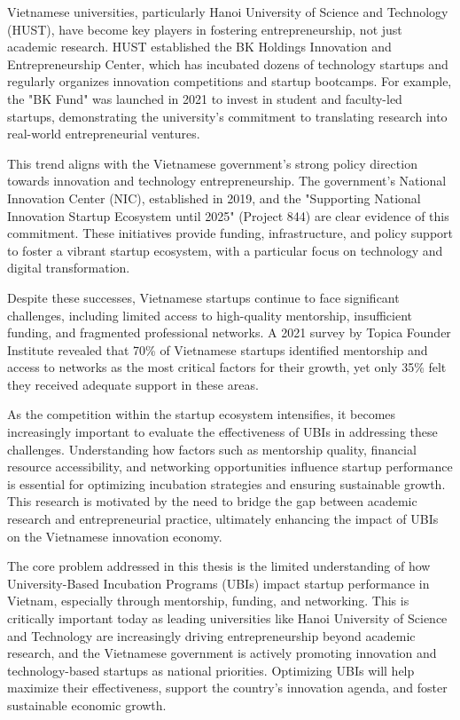 \documentclass[../Main.tex]{subfiles}
\begin{document}
	Vietnamese universities, particularly Hanoi University of Science and Technology (HUST), have become key players in fostering entrepreneurship, not just academic research. HUST established the BK Holdings Innovation and Entrepreneurship Center, which has incubated dozens of technology startups and regularly organizes innovation competitions and startup bootcamps. For example, the "BK Fund" was launched in 2021 to invest in student and faculty-led startups, demonstrating the university's commitment to translating research into real-world entrepreneurial ventures.

	This trend aligns with the Vietnamese government's strong policy direction towards innovation and technology entrepreneurship. The government's National Innovation Center (NIC), established in 2019, and the "Supporting National Innovation Startup Ecosystem until 2025" (Project 844) are clear evidence of this commitment. These initiatives provide funding, infrastructure, and policy support to foster a vibrant startup ecosystem, with a particular focus on technology and digital transformation.

	Despite these successes, Vietnamese startups continue to face significant challenges, including limited access to high-quality mentorship, insufficient funding, and fragmented professional networks. A 2021 survey by Topica Founder Institute revealed that 70\% of Vietnamese startups identified mentorship and access to networks as the most critical factors for their growth, yet only 35\% felt they received adequate support in these areas.

	As the competition within the startup ecosystem intensifies, it becomes increasingly important to evaluate the effectiveness of UBIs in addressing these challenges. Understanding how factors such as mentorship quality, financial resource accessibility, and networking opportunities influence startup performance is essential for optimizing incubation strategies and ensuring sustainable growth. This research is motivated by the need to bridge the gap between academic research and entrepreneurial practice, ultimately enhancing the impact of UBIs on the Vietnamese innovation economy.

	\begin{condensed_idea}
		The core problem addressed in this thesis is the limited understanding of how University-Based Incubation Programs (UBIs) impact startup performance in Vietnam, especially through mentorship, funding, and networking. This is critically important today as leading universities like Hanoi University of Science and Technology are increasingly driving entrepreneurship beyond academic research, and the Vietnamese government is actively promoting innovation and technology-based startups as national priorities. Optimizing UBIs will help maximize their effectiveness, support the country's innovation agenda, and foster sustainable economic growth.
	\end{condensed_idea}
\end{document}
